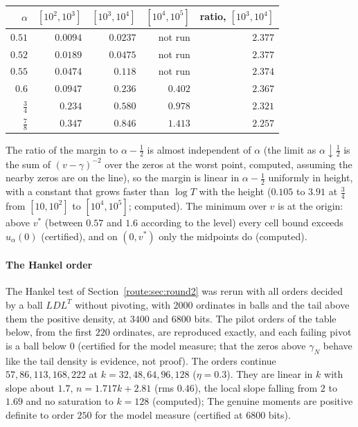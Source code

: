 \begin{center}\small
\begin{tabular}{rrrrr}
\toprule
$\alpha$ & $[10^2,10^3]$ & $[10^3,10^4]$ & $[10^4,10^5]$ & ratio, $[10^3,10^4]$\\
\midrule
$0.51$ & $0.0094$ & $0.0237$ & not run & $2.377$\\
$0.52$ & $0.0189$ & $0.0475$ & not run & $2.377$\\
$0.55$ & $0.0474$ & $0.118$ & not run & $2.374$\\
$0.6$ & $0.0947$ & $0.236$ & $0.402$ & $2.367$\\
$\frac34$ & $0.234$ & $0.580$ & $0.978$ & $2.321$\\
$\frac78$ & $0.347$ & $0.846$ & $1.413$ & $2.257$\\
\bottomrule
\end{tabular}
\end{center}

The ratio of the margin to $\alpha-\frac12$ is almost independent of $\alpha$ (the limit as $\alpha\downarrow\frac12$ is the sum of $(v-\gamma)^{-2}$ over the zeros at the worst point, computed, assuming the nearby zeros are on the line), so the margin is linear in $\alpha-\frac12$ uniformly in height, with a constant that grows faster than $\log T$ with the height ($0.105$ to $3.91$ at $\frac34$ from $[10,10^2]$ to $[10^4,10^5]$; computed). The minimum over $v$ is at the origin: above $v^*$ (between $0.57$ and $1.6$ according to the level) every cell bound exceeds $u_\alpha(0)$ (certified), and on $(0,v^*)$ only the midpoints do (computed).

\paragraph{The Hankel order} The Hankel test of Section~\ref{route:sec:round2} was rerun with all orders decided by a ball $LDL^T$ without pivoting, with $2000$ ordinates in balls and the tail above them the positive density, at $3400$ and $6800$ bits. The pilot orders of the table below, from the first $220$ ordinates, are reproduced exactly, and each failing pivot is a ball below $0$ (certified for the model measure; that the zeros above $\gamma_N$ behave like the tail density is evidence, not proof). The orders continue $57,86,113,168,222$ at $k=32,48,64,96,128$ ($\eta=0.3$). They are linear in $k$ with slope about $1.7$, $n=1.717k+2.81$ (rms $0.46$), the local slope falling from $2$ to $1.69$ and no saturation to $k=128$ (computed); The genuine moments are positive definite to order $250$ for the model measure (certified at $6800$ bits).

